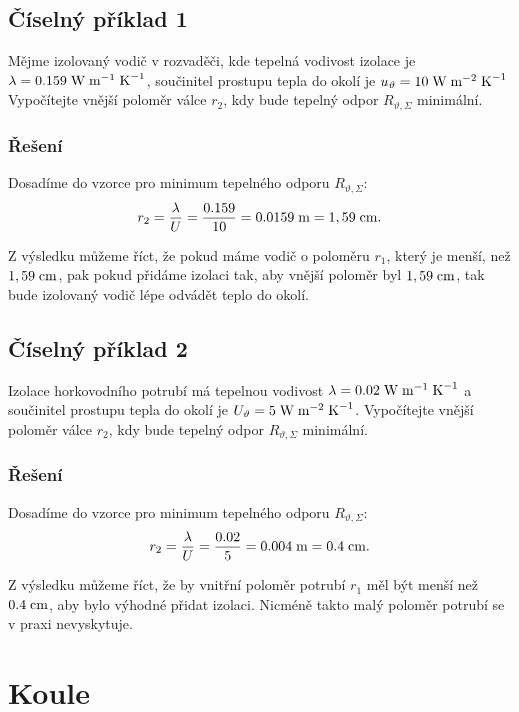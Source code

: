 \documentclass{article}
\begin{document}
\subsection{Číselný příklad 1 \spicy \spicy}
Mějme izolovaný vodič v rozvaděči, kde tepelná vodivost izolace je $\lambda = 0.159 \; \textrm{W} \; \textrm{m}^{-1} \; \textrm{K}^{-1}$, součinitel prostupu tepla do okolí je $u_{\vartheta} = 10 \; \textrm{W} \; \textrm{m}^{-2} \; \textrm{K}^{-1}$ Vypočítejte vnější poloměr válce $r_2$, kdy bude tepelný odpor $R_{\vartheta,\Sigma}$ minimální.

\subsubsection{Řešení}
Dosadíme do vzorce pro minimum tepelného odporu $R_{\vartheta,\Sigma}$:
$$
    r_2 = \frac{\lambda}{U} = \frac{0.159}{10} = 0.0159 \; \textrm{m} = 1,59 \; \textrm{cm}.
$$

Z výsledku můžeme říct, že pokud máme vodič o poloměru $r_1$, který je menší, než $1,59 \; \textrm{cm}$, pak pokud přidáme izolaci tak, aby vnější poloměr byl $1,59 \; \textrm{cm}$, tak bude izolovaný vodič lépe odvádět teplo do okolí.


\subsection{Číselný příklad 2 \spicy \spicy}
Izolace horkovodního potrubí má tepelnou vodivost $\lambda = 0.02 \; \textrm{W} \; \textrm{m}^{-1} \; \textrm{K}^{-1}$ a součinitel prostupu tepla do okolí je $U_{\vartheta} = 5 \; \textrm{W} \; \textrm{m}^{-2} \; \textrm{K}^{-1}$. Vypočítejte vnější poloměr válce $r_2$, kdy bude tepelný odpor $R_{\vartheta,\Sigma}$ minimální.

\subsubsection{Řešení}
Dosadíme do vzorce pro minimum tepelného odporu $R_{\vartheta,\Sigma}$:
$$
    r_2 = \frac{\lambda}{U} = \frac{0.02}{5} = 0.004 \; \textrm{m} = 0.4 \; \textrm{cm}.
$$

Z výsledku můžeme říct, že by vnitřní poloměr potrubí $r_1$ měl být menší než $0.4 \; \textrm{cm}$, aby bylo výhodné přidat izolaci. Nicméně takto malý poloměr potrubí se v praxi nevyskytuje.

\newpage



\section{Koule \spicy \spicy \spicy}
\end{document}
